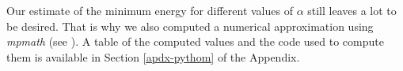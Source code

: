 Our estimate of the minimum energy for different values of $\alpha$ still leaves a lot to be desired. That is why we also computed a numerical approximation using \textit{mpmath} (see \cite{mpmath}). A table of the computed values and the code used to compute them is available in Section \ref{apdx-pythom} of the Appendix.


